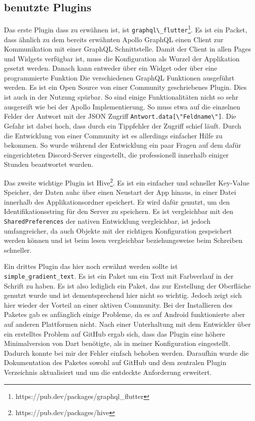 \subsection{benutzte Plugins}
Das erste Plugin dass zu erwähnen ist, ist \verb|graphql\_flutter|\footnote{https://pub.dev/packages/graphql\_flutter}. Es ist ein Packet, dass ähnlich zu dem bereits erwähnten Apollo GraphQL einen Client zur Kommunikation mit einer GraphQL Schnittstelle. Damit der Client in allen Pages und Widgets verfügbar ist, muss die Konfiguration als Wurzel der Applikation gesetzt werden. Danach kann entweder über ein Widget oder über eine programmierte Funktion Die verschiedenen GraphQL Funktionen ausgeführt werden. Es ist ein Open Source von einer Community geschriebenes Plugin. Dies ist auch in der Nutzung spürbar. So sind einige Funktionalitäten nicht so sehr ausgereift wie bei der Apollo Implementierung. So muss etwa auf die einzelnen Felder der Antwort mit der JSON Zugriff \verb|Antwort.data[\"Feldname\"]|. Die Gefahr ist dabei hoch, dass durch ein Tippfehler der Zugriff schief läuft. Durch die Entwicklung von einer Community ist es allerdings einfacher Hilfe zu bekommen. So wurde während der Entwicklung ein paar Fragen auf dem dafür eingerichteten Discord-Server eingestellt, die professionell innerhalb einiger Stunden beantwortet wurden.

Das zweite wichtige Plugin ist Hive\footnote{https://pub.dev/packages/hive}. Es ist ein einfacher und schneller Key-Value Speicher, der Daten auhc über einen Neustart der App hinaus, in einer Datei innerhalb des Applikationsordner speichert. Er wird dafür genutzt, um den Identifikationsstring für den Server zu speichern. Es ist vergleichbar mit den \verb|SharedPreferences| der nativen Entwicklung vergleichbar, ist jedoch umfangreicher, da auch Objekte mit der richtigen Konfiguration gespeichert werden können und ist beim lesen vergleichbar beziehungsweise beim Schreiben schneller.

Ein drittes Plugin das hier noch erwähnt werden sollte ist \verb|simple_gradient_text|. Es ist ein Paket um ein Text mit Farbverlauf in der Schrift zu haben. Es ist also lediglich ein Paket, das zur Erstellung der Oberfläche genutzt wurde und ist dementsprechend hier nicht so wichtig. Jedoch zeigt sich hier wieder der Vorteil an einer aktiven Community. Bei der Installieren des Paketes gab es anfänglich einige Probleme, da es auf Android funktionierte aber auf anderen Plattformen nicht. Nach einer Unterhaltung mit dem Entwickler über ein erstelltes Problem auf GitHub ergab sich, dass das Plugin eine höhere Minimalversion von Dart benötigte, als in meiner Konfiguration eingestellt. Dadurch konnte bei mir der Fehler einfach behoben werden. Daraufhin wurde die Dokumentation des Paketes sowohl auf GitHub und dem zentralen Plugin Verzeichnis aktualisiert und um die entdeckte Anforderung erweitert.

